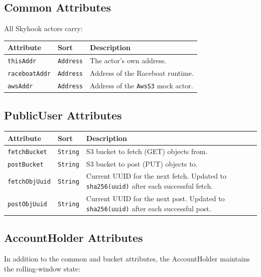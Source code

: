 \documentclass[11pt]{article}
\begin{document}
\subsection{Common Attributes}

All Skyhook actors carry:

\begin{table}[H]
\centering
\begin{tabular}{@{}llp{7cm}@{}}
\toprule
\textbf{Attribute} & \textbf{Sort} & \textbf{Description} \\
\midrule
\texttt{thisAddr}      & \texttt{Address} & The actor's own address. \\
\texttt{raceboatAddr}  & \texttt{Address} & Address of the Raceboat runtime. \\
\texttt{awsAddr}       & \texttt{Address} & Address of the \texttt{AwsS3} mock actor. \\
\bottomrule
\end{tabular}
\end{table}

\subsection{PublicUser Attributes}

\begin{table}[H]
\centering
\begin{tabular}{@{}llp{7cm}@{}}
\toprule
\textbf{Attribute} & \textbf{Sort} & \textbf{Description} \\
\midrule
\texttt{fetchBucket}   & \texttt{String} & S3 bucket to fetch (GET) objects from. \\
\texttt{postBucket}    & \texttt{String} & S3 bucket to post (PUT) objects to. \\
\texttt{fetchObjUuid}  & \texttt{String} & Current UUID for the next fetch. Updated to \texttt{sha256(uuid)} after each successful fetch. \\
\texttt{postObjUuid}   & \texttt{String} & Current UUID for the next post. Updated to \texttt{sha256(uuid)} after each successful post. \\
\bottomrule
\end{tabular}
\end{table}

\subsection{AccountHolder Attributes}

In addition to the common and bucket attributes, the AccountHolder
maintains the rolling-window state:
\end{document}
